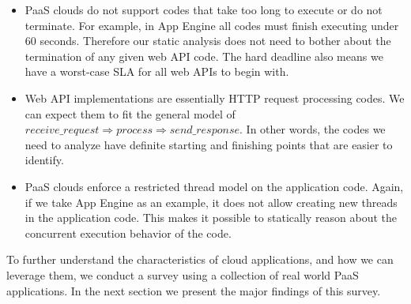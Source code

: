 \begin{itemize}
\item PaaS clouds do not support codes that take too long to execute or do not terminate. For 
example, in App Engine all codes must finish executing under 60 seconds.
Therefore our static analysis does not need to bother about the termination of any given web API
code. The hard deadline also means we have a worst-case SLA for all web APIs to begin with.
\item Web API implementations are essentially HTTP request processing codes. We can expect them
to fit the general model of $receive\_request \Rightarrow process \Rightarrow send\_response$. In
other words, the codes we need to analyze have definite starting and finishing points that are easier
to identify.
\item PaaS clouds enforce a restricted thread model on the application code. Again, if we take
App Engine as an example, it does not allow creating new threads in the application code. This
makes it possible to statically reason about the concurrent execution behavior of the code.
\end{itemize}

To further understand the characteristics of cloud applications, and how we can leverage them,
we conduct a survey
using a collection of real world PaaS applications. In the next section we present the major findings
of this survey.
